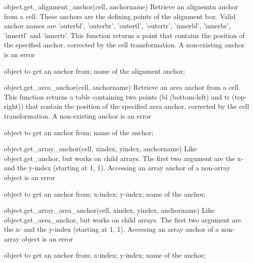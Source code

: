 \begin{APIfunc}{object.get\_alignment\_anchor(cell, anchorname)}
    Retrieve an alignemtn anchor from a cell. These anchors are the defining points of the alignment box. Valid anchor names are 'outerbl', 'outerbr', 'outertl', 'outertr', 'innerbl', 'innerbr', 'innertl' and 'innertr'. This function returns a point that contains the position of the specified anchor, corrected by the cell transformation. A non-existing anchor is an error
    \begin{APIparameters}
            object to get an anchor from;
            name of the alignment anchor;
    \end{APIparameters}
\end{APIfunc}
\begin{APIfunc}{object.get\_area\_anchor(cell, anchorname)}
    Retrieve an area anchor from a cell. This function returns a table containing two points (bl (bottom-left) and tr (top-right)) that contain the position of the specified area anchor, corrected by the cell transformation. A non-existing anchor is an error
    \begin{APIparameters}
            object to get an anchor from;
            name of the anchor;
    \end{APIparameters}
\end{APIfunc}
\begin{APIfunc}{object.get\_array\_anchor(cell, xindex, yindex, anchorname)}
    Like object.get\_anchor, but works on child arrays. The first two argument are the x- and the y-index (starting at 1, 1). Accessing an array anchor of a non-array object is an error
    \begin{APIparameters}
            object to get an anchor from;
            x-index;
            y-index;
            name of the anchor;
    \end{APIparameters}
\end{APIfunc}
\begin{APIfunc}{object.get\_array\_area\_anchor(cell, xindex, yindex, anchorname)}
    Like object.get\_area\_anchor, but works on child arrays. The first two argument are the x- and the y-index (starting at 1, 1). Accessing an array anchor of a non-array object is an error
    \begin{APIparameters}
            object to get an anchor from;
            x-index;
            y-index;
            name of the anchor;
    \end{APIparameters}
\end{APIfunc}
